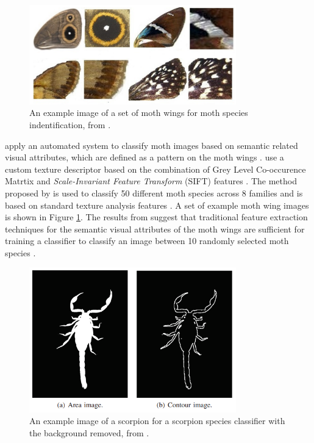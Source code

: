 \documentclass[12pt]{article}
\begin{document}
\begin{figure}[h]
    \centering
    \includegraphics[width=0.8\textwidth]{assets/images/moths.png}
    \caption{An example image of a set of moth wings for moth species
        indentification, from \citeauthor*{feng_automated_2013}
        \cite{feng_automated_2013}.}
    \label{fig:moths}
\end{figure}

\citeauthor*{feng_automated_2013} apply an automated system to classify moth
images based on semantic related visual attributes, which are defined as a
pattern on the moth wings \cite{feng_automated_2013}.
\citeauthor*{feng_automated_2013} use a custom texture descriptor based on the
combination of Grey Level Co-occurence Matrtix and \textit{Scale-Invariant
    Feature Transform} (SIFT) features \cite{gotlieb_texture_1990,
    lowe_distinctive_2004}. The method proposed by \citeauthor*{feng_automated_2013}
is used to classify 50 different moth species across 8 families and is based on
standard texture analysis features \cite{feng_automated_2013}. A set of example
moth wing images is shown in Figure \ref{fig:moths}. The results from
\citeauthor*{feng_automated_2013} suggest that traditional feature extraction
techniques for the semantic visual attributes of the moth wings are
sufficient for training a classifier to classify an image between 10 randomly
selected moth species \cite{feng_automated_2013}.

\begin{figure}[h]
    \centering
    \includegraphics[width=0.8\textwidth]{assets/images/scorpions.png}
    \caption{An example image of a scorpion for a scorpion species classifier
        with the background removed, from \citeauthor*{urteaga_scorpions_2016}
        \cite{urteaga_scorpions_2016}.}
    \label{fig:scorpions}
\end{figure}
\end{document}
